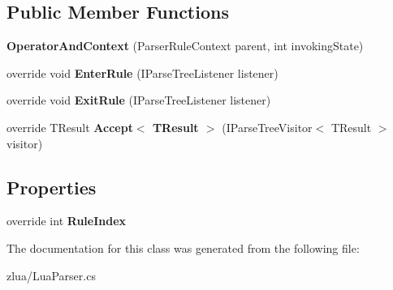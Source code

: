 \subsection*{Public Member Functions}
\begin{DoxyCompactItemize}
\item 
\mbox{\label{classzlua_1_1_lua_parser_1_1_operator_and_context_a666e8d7751d4380d51057523fbd0b047}} 
{\bfseries Operator\+And\+Context} (Parser\+Rule\+Context parent, int invoking\+State)
\item 
\mbox{\label{classzlua_1_1_lua_parser_1_1_operator_and_context_a43d93a18445b067e362808c945f7b0ce}} 
override void {\bfseries Enter\+Rule} (I\+Parse\+Tree\+Listener listener)
\item 
\mbox{\label{classzlua_1_1_lua_parser_1_1_operator_and_context_ae877d99432f0b8d257c5ad40e8665f36}} 
override void {\bfseries Exit\+Rule} (I\+Parse\+Tree\+Listener listener)
\item 
\mbox{\label{classzlua_1_1_lua_parser_1_1_operator_and_context_a4734f313a35064c1a187e26a0f55ea2a}} 
override T\+Result {\bfseries Accept$<$ T\+Result $>$} (I\+Parse\+Tree\+Visitor$<$ T\+Result $>$ visitor)
\end{DoxyCompactItemize}
\subsection*{Properties}
\begin{DoxyCompactItemize}
\item 
\mbox{\label{classzlua_1_1_lua_parser_1_1_operator_and_context_a735873e56d1212c315acd6ecf6cba230}} 
override int {\bfseries Rule\+Index}
\end{DoxyCompactItemize}


The documentation for this class was generated from the following file\+:\begin{DoxyCompactItemize}
\item 
zlua/Lua\+Parser.\+cs\end{DoxyCompactItemize}
